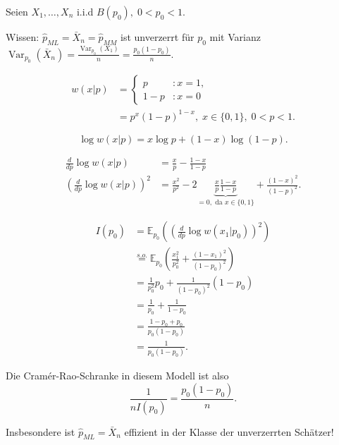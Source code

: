 \documentclass{tstextbook}
\DeclareMathOperator{\Var}{Var}
\newcommand{\E}{\mathbb E}
\begin{document}
\begin{example}
	Seien $ X_1,\ldots,X_n $ i.i.d $ B(p_0), \; 0<p_0<1 $. 
	
	Wissen: $ \hat{p}_{ML} = \bar{X}_n = \hat{p}_{MM} $ ist unverzerrt für $ p_0 $ mit Varianz $ \Var_{p_0}(\bar{X}_n) = \frac{\Var_{p_0}(X_1)}{n} = \frac{p_0(1-p_0)}{n} $. 
	
	\[
	\begin{aligned}
		w(x|p) & =\left\{\begin{array}{ll}
			p & \colon x=1, \\
			1-p & \colon x=0 \end{array}\right .\\
		& = p^x(1-p)^{1-x}, \; x\in\lbrace0,1\rbrace, \; 0<p<1.
	\end{aligned}
	\]
	
	\[
	\log w(x|p) = x\log p + (1-x)\log(1-p).
	\]
	
	\[\begin{aligned}
	\frac{d}{dp}\log w(x|p) & = \frac{x}{p} - \frac{1-x}{1-p} \\
	\left(\frac{d}{dp}\log w(x|p)\right)^2 & = \frac{x^2}{p^2} - 2\underbrace{\frac{x}{p}\frac{1-x}{1-p}}_{=0, \text{ da } x\in\lbrace0,1\rbrace} + \frac{(1-x)^2}{(1-p)^2}.
	\end{aligned}
	\]
	
	\[
	\begin{aligned}
		I(p_0) & = \E_{p_0} \left(\left(\frac{d}{dp}\log w(x_1|p_0)\right)^2\right) \\
		& \overset{s.o.}{=} \E_{p_0} \left(\frac{x_1^2}{p_0^2} + \frac{(1-x_1)^2}{(1-p_0)^2}\right)\\
		& = \frac{1}{p_0^2}p_0 +\frac{1}{(1-p_0)^2}(1-p_0) \\
		& = \frac{1}{p_0} + \frac{1}{1-p_0} \\
		& = \frac{1-p_0+p_0}{p_0(1-p_0)} \\
		& = \frac{1}{p_0(1-p_0)}.
	\end{aligned}
	\]
	
	Die Cramér-Rao-Schranke in diesem Modell ist also 
	\[
	\frac{1}{nI(p_0)} = \frac{p_0(1-p_0)}{n}.
	\]
	
	Insbesondere ist $ \hat{p}_{ML} = \bar{X}_n $ effizient in der Klasse der unverzerrten Schätzer!
\end{example}
\end{document}

